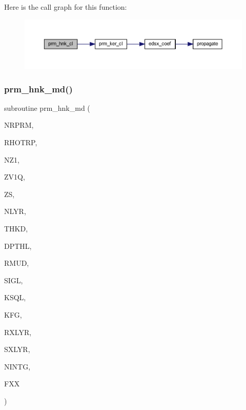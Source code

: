 Here is the call graph for this function\+:\nopagebreak
\begin{figure}[H]
\begin{center}
\leavevmode
\includegraphics[width=350pt]{Leroi__c_8f90_a677c57fa23bac760da7b8f845b3f9f9d_cgraph}
\end{center}
\end{figure}
\mbox{\label{Leroi__c_8f90_a9740ab7613ac873fc595cc92e6d5fbaf}} 
\subsubsection{\texorpdfstring{prm\+\_\+hnk\+\_\+md()}{prm\_hnk\_md()}}
{\footnotesize\ttfamily subroutine prm\+\_\+hnk\+\_\+md (\begin{DoxyParamCaption}\item[{integer}]{N\+R\+P\+RM,  }\item[{real, dimension(nrprm)}]{R\+H\+O\+T\+RP,  }\item[{integer}]{N\+Z1,  }\item[{real(kind=ql), dimension(nz1)}]{Z\+V1Q,  }\item[{real(kind=ql)}]{ZS,  }\item[{integer}]{N\+L\+YR,  }\item[{real(kind=ql), dimension (nlyr)}]{T\+H\+KD,  }\item[{real(kind=ql), dimension (nlyr)}]{D\+P\+T\+HL,  }\item[{real(kind=ql), dimension(0\+:nlyr)}]{R\+M\+UD,  }\item[{complex(kind=ql), dimension (nlyr)}]{S\+I\+GL,  }\item[{complex(kind=ql), dimension (nlyr)}]{K\+S\+QL,  }\item[{integer}]{K\+FG,  }\item[{integer}]{R\+X\+L\+YR,  }\item[{integer}]{S\+X\+L\+YR,  }\item[{integer}]{N\+I\+N\+TG,  }\item[{complex(kind=ql), dimension(nrprm,5,nz1)}]{F\+XX }\end{DoxyParamCaption})}

